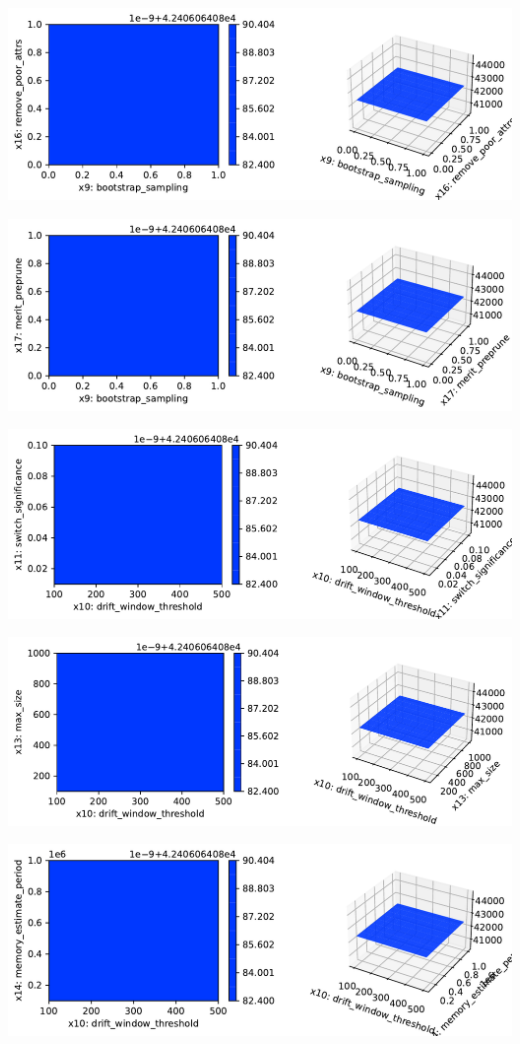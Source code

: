 \documentclass[
  letterpaper,
  DIV=11,
  numbers=noendperiod]{scrreprt}
\begin{document}
\includegraphics{024_spot_hpt_river_friedman_hatr_files/figure-pdf/cell-42-output-90.pdf}

\includegraphics{024_spot_hpt_river_friedman_hatr_files/figure-pdf/cell-42-output-91.pdf}

\includegraphics{024_spot_hpt_river_friedman_hatr_files/figure-pdf/cell-42-output-92.pdf}

\includegraphics{024_spot_hpt_river_friedman_hatr_files/figure-pdf/cell-42-output-93.pdf}

\includegraphics{024_spot_hpt_river_friedman_hatr_files/figure-pdf/cell-42-output-94.pdf}
\end{document}
